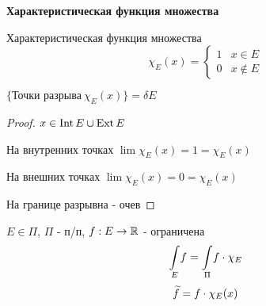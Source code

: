 
\setcounter{lemma}{9}





    {\noindent\large\textbf{Характеристическая функция множества}} \hfill {}

    \begin{definition}
        Характеристическая функция множества 
        \begin{equation*}
            \chi_{E}(x) = 
             \begin{cases}
               1 & x \in E \\
               0 & x \not \in E
             \end{cases}
            \end{equation*}
    \end{definition}


    \begin{lemma}
        $\{\text{Точки разрыва} \ \chi_{E}(x)\} = \delta E$ 
    \end{lemma}

    \begin{proof}
       \par $x \in \operatorname{Int} E \cup \operatorname{Ext} E $
       \par На внутренних точках $\lim \chi_{E}(x) = 1 = \chi_{E}(x)$
       \par На внешних точках $\lim \chi_{E}(x) = 0 = \chi_{E}(x)$
       \bigskip
       \par На границе разрывна - очев

    \end{proof}

    \begin{definition}
        \par $E \in \Pi$, $\Pi$ - п/п, $f: E \rightarrow \mathbb{R}$ - ограничена
        \bigskip
        $$\underset{E}{\int} f = \underset{\Pi}{\int} f\cdot \chi_{E}$$
        \bigskip
        $$\widetilde f = f \cdot \chi_{E}(x)$$

    \end{definition}

